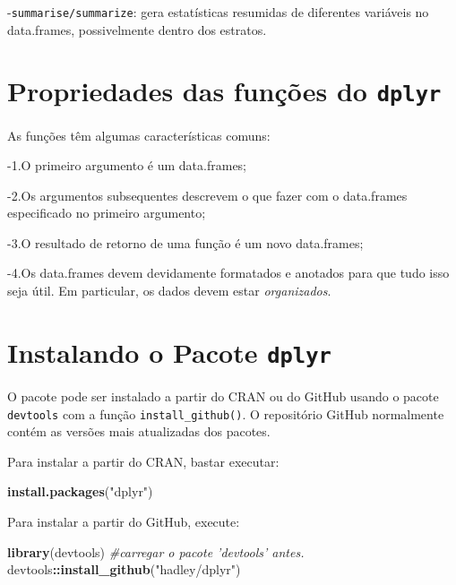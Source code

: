 \documentclass[]{book}
\newenvironment{Shaded}{\begin{snugshade}}{\end{snugshade}}
\newcommand{\CommentTok}[1]{\textcolor[rgb]{0.56,0.35,0.01}{\textit{#1}}}
\newcommand{\KeywordTok}[1]{\textcolor[rgb]{0.13,0.29,0.53}{\textbf{#1}}}
\newcommand{\NormalTok}[1]{#1}
\newcommand{\OperatorTok}[1]{\textcolor[rgb]{0.81,0.36,0.00}{\textbf{#1}}}
\newcommand{\StringTok}[1]{\textcolor[rgb]{0.31,0.60,0.02}{#1}}
\begin{document}
-\texttt{summarise/summarize}: gera estatísticas resumidas de diferentes variáveis no data.frames, possivelmente dentro dos estratos.

\hypertarget{propriedades-das-funuxe7uxf5es-do-dplyr}{%
\section{\texorpdfstring{Propriedades das funções do \texttt{dplyr}}{Propriedades das funções do dplyr}}\label{propriedades-das-funuxe7uxf5es-do-dplyr}}

As funções têm algumas características comuns:

-1.O primeiro argumento é um data.frames;

-2.Os argumentos subsequentes descrevem o que fazer com o data.frames especificado no primeiro argumento;

-3.O resultado de retorno de uma função é um novo data.frames;

-4.Os data.frames devem devidamente formatados e anotados para que tudo isso seja útil. Em particular, os dados devem estar \emph{organizados}.

\hypertarget{instalando-o-pacote-dplyr}{%
\section{\texorpdfstring{Instalando o Pacote \texttt{dplyr}}{Instalando o Pacote dplyr}}\label{instalando-o-pacote-dplyr}}

O pacote pode ser instalado a partir do CRAN ou do GitHub usando o pacote \texttt{devtools} com a função \texttt{install\_github()}. O repositório GitHub normalmente contém as versões mais atualizadas dos pacotes.

Para instalar a partir do CRAN, bastar executar:

\begin{Shaded}
\begin{Highlighting}[]
\KeywordTok{install.packages}\NormalTok{(}\StringTok{"dplyr"}\NormalTok{)}
\end{Highlighting}
\end{Shaded}

Para instalar a partir do GitHub, execute:

\begin{Shaded}
\begin{Highlighting}[]
\KeywordTok{library}\NormalTok{(devtools) }\CommentTok{#carregar o pacote 'devtools' antes.}
\NormalTok{devtools}\OperatorTok{::}\KeywordTok{install_github}\NormalTok{(}\StringTok{"hadley/dplyr"}\NormalTok{)}
\end{Highlighting}
\end{Shaded}
\end{document}
